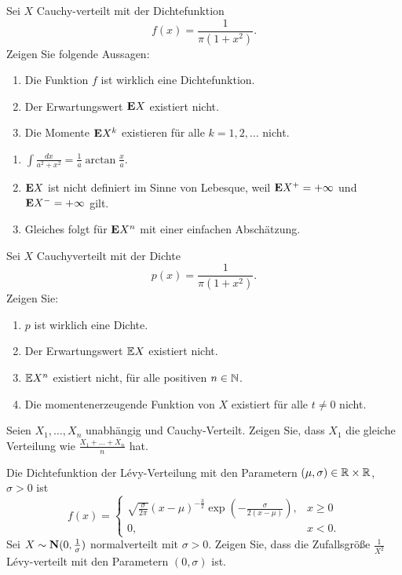 Sei $X$ Cauchy-verteilt mit der Dichtefunktion
\begin{equation*}
    f(x) = \frac{1}{\pi (1+x^2)}.
\end{equation*}
Zeigen Sie folgende Aussagen:
\begin{enumerate}
    \item Die Funktion $f$ ist wirklich eine Dichtefunktion.
    \item Der Erwartungswert $\mathbf E X$ existiert nicht.
    \item Die Momente $\mathbf E X^k$ existieren für alle $k=1,2,\dots$ nicht.
\end{enumerate}

\solution
\begin{enumerate}
    \item $\int \frac{dx}{a^2+x^2} = \frac{1}{a} \arctan \frac{x}{a}$.
    \item $\mathbf E X$ ist nicht definiert im Sinne von Lebesque, weil 
        $\mathbf E X^{+}=+\infty$ und $\mathbf E X^{-}=+\infty$ gilt. 
    \item Gleiches folgt für $\mathbf E X^{n}$ mit einer einfachen Abschätzung.
\end{enumerate}


Sei $X$ Cauchyverteilt mit der Dichte
\begin{equation*}
    p(x) = \frac{1}{\pi (1+x^2)}.
\end{equation*}
Zeigen Sie:
\begin{enumerate}
    \item $p$ ist wirklich eine Dichte.
    \item Der Erwartungswert $\mathbb{E} X$ existiert nicht.
    \item $\mathbb{E} X^n$ existiert nicht, für alle positiven $n\in \mathbb N$. 
    \item Die momentenerzeugende Funktion von $X$ existiert für alle $t \neq 0$ nicht. 
\end{enumerate}

 Seien $X_1,\dots ,X_n$
unabhängig und Cauchy-Verteilt. Zeigen Sie, dass $X_1$ die gleiche
Verteilung wie $\frac{X_1 +\dots + X_n}{n}$ hat. 




 Die Dichtefunktion der
L\'evy-Verteilung mit den Parametern $(\mu,\sigma)\in \mathbb R\times\mathbb R$, $\sigma>0$ ist
\begin{equation*}
    f(x) = 
    \begin{cases}
    \sqrt{ \frac{\sigma}{2\pi}} (x-\mu)^{-\frac{3}{2}} \exp\left( -\frac{\sigma}{2(x-\mu)} \right), & x\geq 0 \\
    0, & x<0.
    \end{cases}
\end{equation*}
Sei $X\sim \mathbf N (0, \frac{1}{\sigma})$ normalverteilt mit $\sigma>0$.  Zeigen
Sie, dass die Zufallsgröße $\frac{1}{X^2}$ L\'evy-verteilt mit den
Parametern $(0,\sigma)$ ist.

